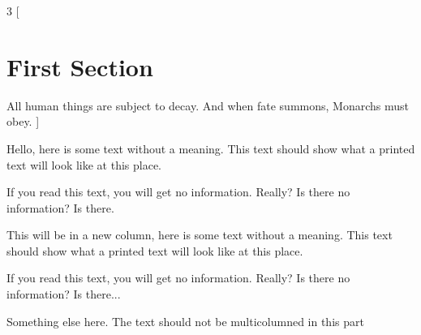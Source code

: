 \documentclass{article}
\begin{document}
\begin{multicols}{3}
[
\section{First Section}
All human things are subject to decay. And when fate summons, Monarchs must obey.
]

Hello, here is some text without a meaning.  This text should show what 
a printed text will look like at this place.

If you read this text, you will get no information.  Really?  Is there 
no information?  Is there.

\columnbreak

This will be in a new column, here is some text without a meaning.  This text 
should show what a printed text will look like at this place.

If you read this text, you will get no information.  Really?  Is there 
no information?  Is there...
\end{multicols}

Something else here. The text should not be multicolumned in this part
\end{document}
